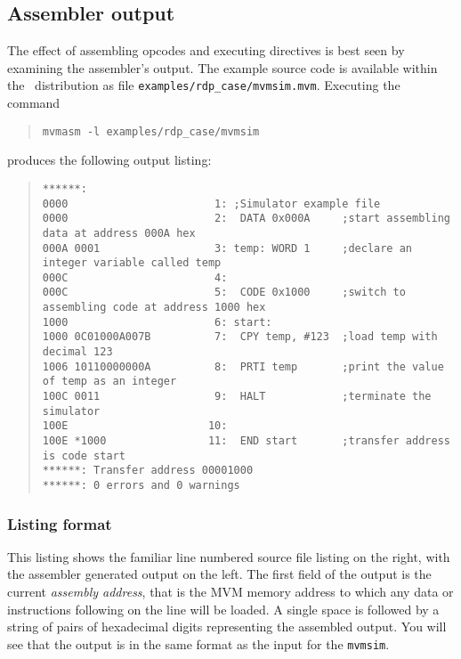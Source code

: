 \subsection{Assembler output}
The effect of assembling opcodes and executing directives is best seen by
examining the assembler's output. The example source code is available
within the \rdp\ distribution as file \verb+examples/rdp_case/mvmsim.mvm+.
Executing the command
\begin{quote}
\small
\verb+mvmasm -l examples/rdp_case/mvmsim+
\end{quote}
produces the following output listing:
\begin{quote}
\hspace*{-1cm}
\begin{minipage}{30cm}
\footnotesize
\begin{verbatim}
******: 
0000                       1: ;Simulator example file
0000                       2:  DATA 0x000A     ;start assembling data at address 000A hex
000A 0001                  3: temp: WORD 1     ;declare an integer variable called temp
000C                       4: 
000C                       5:  CODE 0x1000     ;switch to assembling code at address 1000 hex
1000                       6: start:
1000 0C01000A007B          7:  CPY temp, #123  ;load temp with decimal 123
1006 10110000000A          8:  PRTI temp       ;print the value of temp as an integer
100C 0011                  9:  HALT            ;terminate the simulator
100E                      10: 
100E *1000                11:  END start       ;transfer address is code start
******: Transfer address 00001000
******: 0 errors and 0 warnings
\end{verbatim}
\end{minipage}
\end{quote}

\subsubsection{Listing format}

This listing shows the familiar line numbered source file listing on the
right, with the assembler generated output on the left. The first field
of the output is the current {\em assembly address}, that is the MVM
memory address to which any data or instructions following on the line
will be loaded. A single space is followed by a string of pairs of
hexadecimal digits representing the assembled output. You will see that
the output is in the same format as the input for the {\tt mvmsim}.


